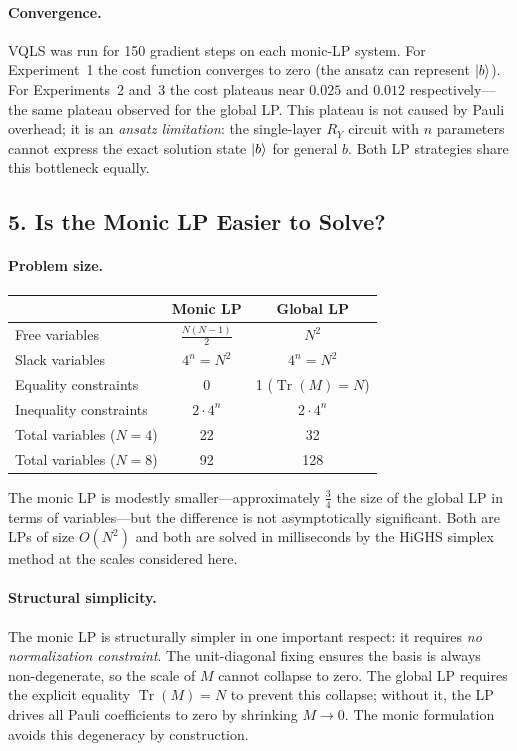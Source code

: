 \documentclass{article}
\begin{document}
\paragraph{Convergence.}
VQLS was run for 150 gradient steps on each monic-LP system.  For Experiment~1 the
cost function converges to zero (the ansatz can represent $\ket{b}$).  For
Experiments~2 and~3 the cost plateaus near $0.025$ and $0.012$ respectively---the
same plateau observed for the global LP.  This plateau is not caused by Pauli
overhead; it is an \emph{ansatz limitation}: the single-layer $R_Y$ circuit with $n$
parameters cannot express the exact solution state $\ket{b}$ for general $b$.  Both
LP strategies share this bottleneck equally.

\subsection*{5. Is the Monic LP Easier to Solve?}

\paragraph{Problem size.}
\begin{center}
\begin{tabular}{lcc}
\toprule
 & Monic LP & Global LP \\
\midrule
Free variables    & $\tfrac{N(N-1)}{2}$ & $N^2$ \\
Slack variables   & $4^n = N^2$         & $4^n = N^2$ \\
Equality constraints & 0                & 1 ($\operatorname{Tr}(M)=N$) \\
Inequality constraints & $2\cdot 4^n$   & $2\cdot 4^n$ \\
\midrule
Total variables ($N=4$) & 22 & 32 \\
Total variables ($N=8$) & 92 & 128 \\
\bottomrule
\end{tabular}
\end{center}
The monic LP is modestly smaller---approximately $\tfrac{3}{4}$ the size of the
global LP in terms of variables---but the difference is not asymptotically significant.
Both are LPs of size $O(N^2)$ and both are solved in milliseconds by the HiGHS
simplex method at the scales considered here.

\paragraph{Structural simplicity.}
The monic LP is structurally simpler in one important respect: it requires
\emph{no normalization constraint}.  The unit-diagonal fixing ensures the basis is
always non-degenerate, so the scale of $M$ cannot collapse to zero.  The global LP
requires the explicit equality $\operatorname{Tr}(M) = N$ to prevent this collapse;
without it, the LP drives all Pauli coefficients to zero by shrinking $M \to 0$.
The monic formulation avoids this degeneracy by construction.
\end{document}
